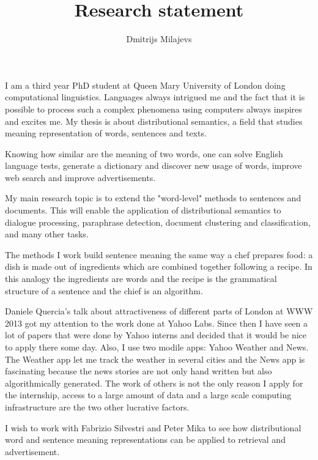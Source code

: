 \documentclass[11pt]{article}
\title{Research statement}
\author{
Dmitrijs Milajevs \\
}
\date{}
\begin{document}
\maketitle

\thispagestyle{empty}


I am a third year PhD student at Queen Mary University of London doing computational linguistics. Languages always intrigued me and the fact that it is possible to process such a complex phenomena using computers always inspires and excites me. My thesis is about distributional semantics, a field that studies meaning representation of words, sentences and texts.

Knowing how similar are the meaning of two words, one can solve English language tests, generate a dictionary and discover new usage of words, improve web search and improve advertisements.

My main research topic is to extend the "word-level" methods to sentences and documents. This will enable the application of distributional semantics to dialogue processing, paraphrase detection, document clustering and classification, and many other tasks.

The methods I work build sentence meaning the same way a chef prepares food: a dish is made out of ingredients which are combined together following a recipe. In this analogy the ingredients are words and the recipe is the grammatical structure of a sentence and the chief is an algorithm.

Daniele Quercia's talk about attractiveness of different parts of London at WWW 2013 got my attention to the work done at Yahoo Labs. Since then I have seen a lot of papers that were done by Yahoo interns and decided that it would be nice to apply there some day. Also, I use two modile apps: Yahoo Weather and News. The Weather app let me track the weather in several cities and the News app is fascinating because the news stories are not only hand written but also algorithmically generated. The work of others is not the only reason I apply for the internship, access to a large amount of data and a large scale computing infrastructure are the two other lucrative factors.

I wish to work with Fabrizio Silvestri and Peter Mika to see how distributional word and sentence meaning representations can be applied to retrieval and advertisement.
\end{document}

